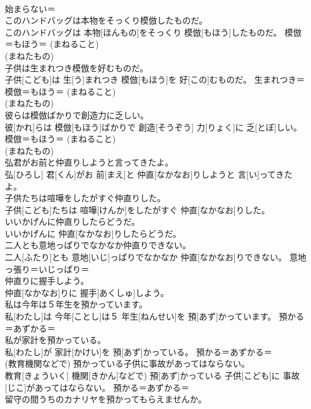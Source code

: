 \documentclass[8pt]{extreport}
\begin{document}
\begin{CJK}{UTF8}{min}
\\	始まらない＝ 
\\	このハンドバッグは本物をそっくり模倣したものだ。	
\\	このハンドバッグは 本物[ほんもの]をそっくり 模倣[もほう]したものだ。	模倣＝もほう＝ (まねること) 
\\	(まねたもの) 
\\	子供は生まれつき模倣を好むものだ。	
\\	子供[こども]は 生[う]まれつき 模倣[もほう]を 好[この]むものだ。	生まれつき＝ 
\\	模倣＝もほう＝ (まねること) 
\\	(まねたもの) 
\\	彼らは模倣ばかりで創造力に乏しい。	
\\	彼[かれ]らは 模倣[もほう]ばかりで 創造[そうぞう] 力[りょく]に 乏[とぼ]しい。	模倣＝もほう＝ (まねること) 
\\	(まねたもの) 
\\	弘君がお前と仲直りしようと言ってきたよ。	
\\	弘[ひろし] 君[くん]がお 前[まえ]と 仲直[なかなお]りしようと 言[い]ってきたよ。	
\\	子供たちは喧嘩をしたがすぐ仲直りした。	
\\	子供[こども]たちは 喧嘩[けんか]をしたがすぐ 仲直[なかなお]りした。	
\\	いいかげんに仲直りしたらどうだ。	
\\	いいかげんに 仲直[なかなお]りしたらどうだ。	
\\	二人とも意地っぱりでなかなか仲直りできない。	
\\	二人[ふたり]とも 意地[いじ]っぱりでなかなか 仲直[なかなお]りできない。	意地っ張り＝いじっぱり＝ 
\\	仲直りに握手しよう。	
\\	仲直[なかなお]りに 握手[あくしゅ]しよう。	
\\	私は今年は５年生を預かっています。	
\\	私[わたし]は 今年[ことし]は５ 年生[ねんせい]を 預[あず]かっています。	預かる＝あずかる＝ 
\\	私が家計を預かっている。	
\\	私[わたし]が 家計[かけい]を 預[あず]かっている。	預かる＝あずかる＝ 
\\	(教育機関などで) 預かっている子供に事故があってはならない。	
\\	教育[きょういく] 機関[きかん]などで) 預[あず]かっている 子供[こども]に 事故[じこ]があってはならない。	預かる＝あずかる＝ 
\\	留守の間うちのカナリヤを預かってもらえませんか。	

\end{CJK}
\end{document}
